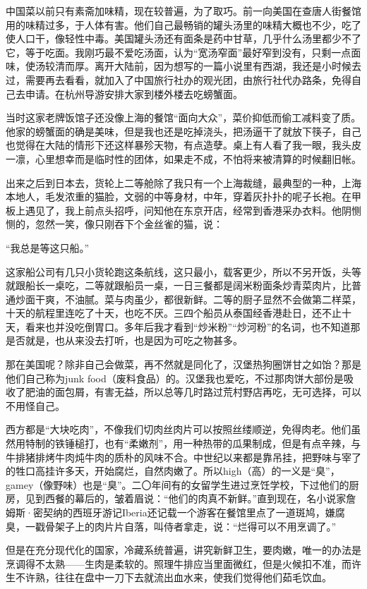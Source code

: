 \par 中国菜以前只有素斋加味精，现在较普遍，为了取巧。前一向美国在查唐人街餐馆用的味精过多，于人体有害。他们自己最畅销的罐头汤里的味精大概也不少，吃了使人口干，像轻性中毒。美国罐头汤还有面条是药中甘草，几乎什么汤里都少不了它，等于吃面。我刚巧最不爱吃汤面，认为“宽汤窄面”最好窄到没有，只剩一点面味，使汤较清而厚。离开大陆前，因为想写的一篇小说里有西湖，我还是小时候去过，需要再去看看，就加入了中国旅行社办的观光团，由旅行社代办路条，免得自己去申请。在杭州导游安排大家到楼外楼去吃螃蟹面。
\par 当时这家老牌饭馆子还没像上海的餐馆“面向大众”，菜价抑低而偷工减料变了质。他家的螃蟹面的确是美味，但是我也还是吃掉浇头，把汤逼干了就放下筷子，自己也觉得在大陆的情形下还这样暴殄天物，有点造孽。桌上有人看了我一眼，我头皮一凛，心里想幸而是临时性的团体，如果走不成，不怕将来被清算的时候翻旧帐。
\par 出来之后到日本去，货轮上二等舱除了我只有一个上海裁缝，最典型的一种，上海本地人，毛发浓重的猫脸，文弱的中等身材，中年，穿着灰扑扑的呢子长袍。在甲板上遇见了，我上前点头招呼，问知他在东京开店，经常到香港采办衣料。他阴恻恻的，忽然一笑，像只刚吞下个金丝雀的猫，说：
\par “我总是等这只船。”
\par 这家船公司有几只小货轮跑这条航线，这只最小，载客更少，所以不另开饭，头等就跟船长一桌吃，二等就跟船员一桌，一日三餐都是阔米粉面条炒青菜肉片，比普通炒面干爽，不油腻。菜与肉虽少，都很新鲜。二等的厨子显然不会做第二样菜，十天的航程里连吃了十天，也吃不厌。三四个船员从泰国经香港赴日，还不止十天，看来也并没吃倒胃口。多年后我才看到“炒米粉”“炒河粉”的名词，也不知道那是否就是，也从来没去打听，也是因为可吃之物甚多。
\par 那在美国呢？除非自己会做菜，再不然就是同化了，汉堡热狗圈饼甘之如饴？那是他们自己称为junk food（废料食品）的。汉堡我也爱吃，不过那肉饼大部份是吸收了肥油的面包屑，有害无益，所以总等几时路过荒村野店再吃，无可选择，可以不用怪自己。
\par 西方都是“大块吃肉”，不像我们切肉丝肉片可以按照丝缕顺逆，免得肉老。他们虽然用特制的铁锤槌打，也有“柔嫩剂”，用一种热带的瓜果制成，但是有点辛辣，与牛排猪排烤牛肉炖牛肉的质朴的风味不合。中世纪以来都是靠吊挂，把野味与宰了的牲口高挂许多天，开始腐烂，自然肉嫩了。所以high（高）的一义是“臭”，gamey（像野味）也是“臭”。二〇年间有的女留学生进过烹饪学校，下过他们的厨房，见到西餐的幕后的，皱着眉说：“他们的肉真不新鲜。”直到现在，名小说家詹姆斯·密契纳的西班牙游记Iberia还记载一个游客在餐馆里点了一道斑鸠，嫌腐臭，一戳骨架子上的肉片片自落，叫侍者拿走，说：“烂得可以不用烹调了。”
\par 但是在充分现代化的国家，冷藏系统普遍，讲究新鲜卫生，要肉嫩，唯一的办法是烹调得不太熟——生肉是柔软的。照理牛排应当里面微红，但是火候扣不准，而许生不许熟，往往在盘中一刀下去就流出血水来，使我们觉得他们茹毛饮血。
